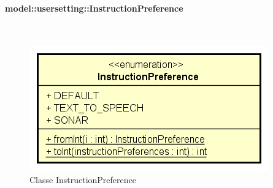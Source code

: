 \documentclass[../DefinizioneDiProdotto.tex]{subfiles}
\begin{document}
\paragraph{model::usersetting::InstructionPreference}
\
\begin{figure}[H]
	\centering
	\includegraphics[width=\maxwidth]{img/InstructionPreference.png}
	\caption{Classe InstructionPreference}\label{fig:model::usersetting::InstructionPreference} 
\end{figure}
\end{document}
